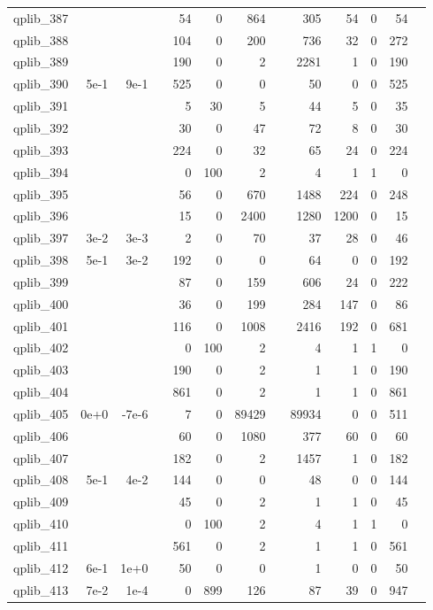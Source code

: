 \begin{table}
\begin{tabular}{lrrrrrrrrrrrr}
qplib\_387	&		&		&	&	54	&	0	&	864	&	&	305	&	54	&	0	&	54	\\
qplib\_388	&		&		&	&	104	&	0	&	200	&	&	736	&	32	&	0	&	272	\\
qplib\_389	&		&		&	&	190	&	0	&	2	&	&	2281	&	1	&	0	&	190	\\
qplib\_390	&	5e-1	&	9e-1	&	&	525	&	0	&	0	&	&	50	&	0	&	0	&	525	\\
qplib\_391	&		&		&	&	5	&	30	&	5	&	&	44	&	5	&	0	&	35	\\
qplib\_392	&		&		&	&	30	&	0	&	47	&	&	72	&	8	&	0	&	30	\\
qplib\_393	&		&		&	&	224	&	0	&	32	&	&	65	&	24	&	0	&	224	\\
qplib\_394	&		&		&	&	0	&	100	&	2	&	&	4	&	1	&	1	&	0	\\
qplib\_395	&		&		&	&	56	&	0	&	670	&	&	1488	&	224	&	0	&	248	\\
qplib\_396	&		&		&	&	15	&	0	&	2400	&	&	1280	&	1200	&	0	&	15	\\
qplib\_397	&	3e-2	&	3e-3	&	&	2	&	0	&	70	&	&	37	&	28	&	0	&	46	\\
qplib\_398	&	5e-1	&	3e-2	&	&	192	&	0	&	0	&	&	64	&	0	&	0	&	192	\\
qplib\_399	&		&		&	&	87	&	0	&	159	&	&	606	&	24	&	0	&	222	\\
qplib\_400	&		&		&	&	36	&	0	&	199	&	&	284	&	147	&	0	&	86	\\
qplib\_401	&		&		&	&	116	&	0	&	1008	&	&	2416	&	192	&	0	&	681	\\
qplib\_402	&		&		&	&	0	&	100	&	2	&	&	4	&	1	&	1	&	0	\\
qplib\_403	&		&		&	&	190	&	0	&	2	&	&	1	&	1	&	0	&	190	\\
qplib\_404	&		&		&	&	861	&	0	&	2	&	&	1	&	1	&	0	&	861	\\
qplib\_405	&	0e+0	&	-7e-6	&	&	7	&	0	&	89429	&	&	89934	&	0	&	0	&	511	\\
qplib\_406	&		&		&	&	60	&	0	&	1080	&	&	377	&	60	&	0	&	60	\\
qplib\_407	&		&		&	&	182	&	0	&	2	&	&	1457	&	1	&	0	&	182	\\
qplib\_408	&	5e-1	&	4e-2	&	&	144	&	0	&	0	&	&	48	&	0	&	0	&	144	\\
qplib\_409	&		&		&	&	45	&	0	&	2	&	&	1	&	1	&	0	&	45	\\
qplib\_410	&		&		&	&	0	&	100	&	2	&	&	4	&	1	&	1	&	0	\\
qplib\_411	&		&		&	&	561	&	0	&	2	&	&	1	&	1	&	0	&	561	\\
qplib\_412	&	6e-1	&	1e+0	&	&	50	&	0	&	0	&	&	1	&	0	&	0	&	50	\\
qplib\_413	&	7e-2	&	1e-4	&	&	0	&	899	&	126	&	&	87	&	39	&	0	&	947	\\

\end{tabular}
\end{table}
